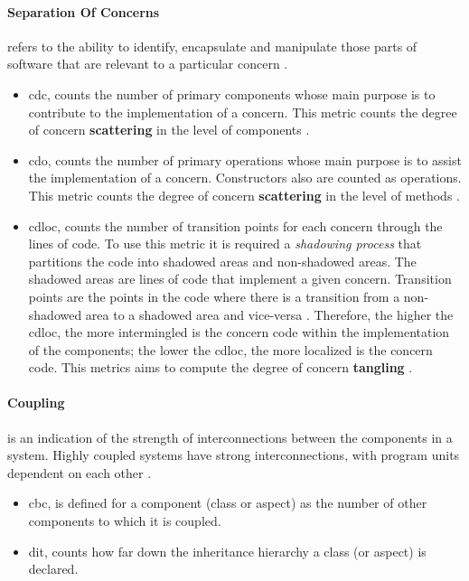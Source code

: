 \paragraph{Separation Of Concerns}refers to the ability to identify, encapsulate and manipulate those parts of software that are relevant to a particular concern \cite{tarr1999n}.
	\begin{itemize}
		\item \ac{cdc}, counts the number of primary components whose main purpose is to contribute to the implementation of a concern.
		This metric counts the degree of concern \textbf{scattering} in the level of components \cite{figueiredo2008maintainability}.

		\item \ac{cdo}, counts the number of primary operations whose main purpose is to assist the implementation of a concern.
		Constructors also are counted as operations.
		This metric counts the degree of concern \textbf{scattering} in the level of methods \cite{figueiredo2008maintainability}.

		\item \ac{cdloc}, counts the number of transition points for each concern through the lines of code.
		To use this metric it is required a \textit{shadowing process} that partitions the code into shadowed areas and non-shadowed areas. 
		The shadowed areas are lines of code that implement a given concern. 
		Transition points are the points in the code where there is a transition from a non-shadowed area to a shadowed area and vice-versa \cite{garcia2003agents}.
		Therefore, the higher the \ac{cdloc}, the more intermingled is the concern code within the implementation of the components; the lower the \ac{cdloc}, the more localized is the concern code.
		This metrics aims to compute the degree of concern \textbf{tangling} \cite{figueiredo2008maintainability}.
	\end{itemize}

\paragraph{Coupling}is an indication of the strength of interconnections between the components in a system. Highly coupled systems have strong interconnections, with program units dependent on each other \cite{sommerville2004software}.
	\begin{itemize}
		\item \ac{cbc}, is defined for a component (class or aspect) as the number of other components to which it is coupled.

		\item \ac{dit}, counts how far down the inheritance hierarchy a class (or aspect) is declared.
	\end{itemize}

